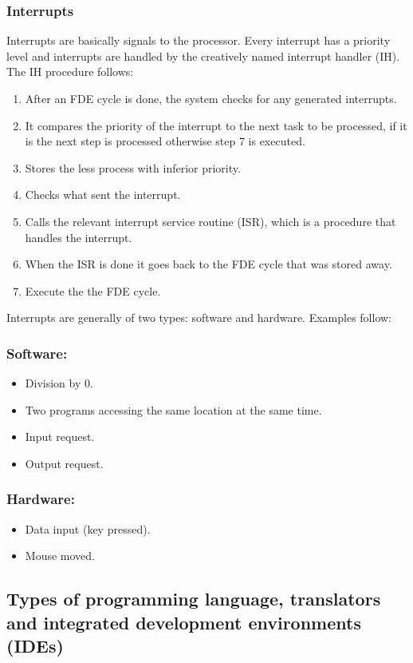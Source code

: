\documentclass{article}
\begin{document}
\subsubsection{Interrupts}
Interrupts are basically signals to the processor. Every interrupt has a priority level
and interrupts are handled by the creatively named interrupt handler (IH). The IH 
procedure follows:
\begin{enumerate}
	\item After an FDE cycle is done, the system checks for any generated interrupts.
	\item It compares the priority of the interrupt to the next task to be processed, if
		it is the next step is processed otherwise step 7 is executed.
	\item Stores the less process with inferior priority.
	\item Checks what sent the interrupt.
	\item Calls the relevant interrupt service routine (ISR), which is a procedure that
		handles the interrupt.
	\item When the ISR is done it goes back to the FDE cycle that was stored away.
	\item Execute the the FDE cycle. 
\end{enumerate}
Interrupts are generally of two types: software and hardware. Examples follow:
\subsubsection* {Software:}
	\begin{itemize}
		\item Division by 0.
		\item Two programs accessing the same location at the same time.
		\item Input request.
		\item Output request.
	\end{itemize}
\subsubsection* {Hardware:}
	\begin{itemize}
		\item Data input (key pressed).
		\item Mouse moved.
	\end{itemize}

\subsection{Types of programming language, translators and integrated development
environments (IDEs)}
\end{document}
